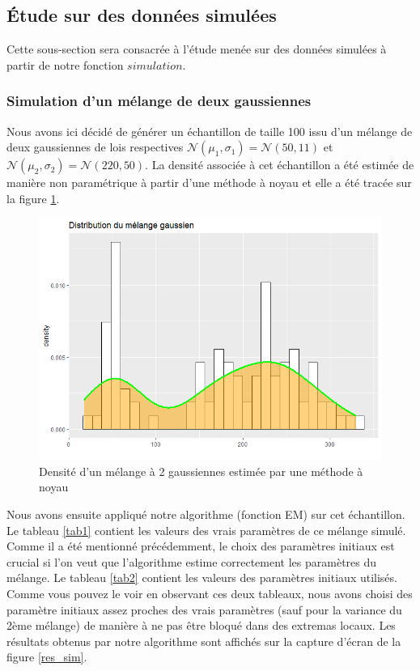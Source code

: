 \documentclass[a4paper,french,10pt]{article}
\begin{document}
\newpage

\subsection{Étude sur des données simulées}
Cette sous-section sera consacrée à l'étude menée sur des données simulées à partir de notre fonction $simulation$.

\subsubsection{Simulation d'un mélange de deux gaussiennes } 
Nous avons ici décidé de générer un échantillon de taille 100 issu d'un mélange de deux gaussiennes de lois respectives $\mathcal{N}(\mu_1, \sigma_1) = \mathcal{N}(50, 11)$ et $\mathcal{N}(\mu_2, \sigma_2) = \mathcal{N}(220, 50)$.
La densité associée à cet échantillon a été estimée de manière non paramétrique à partir d'une méthode à noyau et elle a été tracée sur la figure \ref{density_sim}.

\begin{figure}[htp] 
	\centering
	\includegraphics[scale=0.5]{images/dens_sim.png}
	\caption{Densité d'un mélange à 2 gaussiennes estimée par une méthode à noyau}
	\label{density_sim}
\end{figure}

Nous avons ensuite appliqué notre algorithme (fonction EM) sur cet échantillon. Le tableau \ref{tab1} contient les valeurs des vrais paramètres de ce mélange simulé. Comme il a été mentionné précédemment, le choix des paramètres initiaux est crucial si l'on veut que l'algorithme estime correctement les paramètres du mélange. Le tableau \ref{tab2} contient les valeurs des paramètres initiaux utilisés. Comme vous pouvez le voir en observant ces deux tableaux, nous avons choisi des paramètre initiaux assez proches des vrais paramètres (sauf pour la variance du 2ème mélange) de manière à ne pas être bloqué dans des extremas locaux. Les résultats obtenus par notre algorithme sont affichés sur la capture d'écran de la figure \ref{res_sim}.
\end{document}
